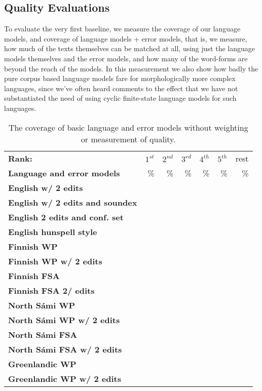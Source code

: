 \documentclass[a4paper,12pt]{article}
\begin{document}

\subsection{Quality Evaluations}

To evaluate the very first baseline, we measure the coverage of our language
models, and coverage of language models + error models, that is, we measure,
how much of the texts themselves can be matched at all, using just the
language models themselves and the error models, and how many of the word-forms
are beyond the reach of the models. In this measurement we also show how badly
the pure corpus based language models fare for morphologically more complex
languages, since we've often heard comments to the effect that we have not
substantiated the need of using cyclic finite-state language models for such
languages.

\begin{table}
    \centering
    \begin{tabular}{|l|r|r|r|r|r|r|}
        \hline
        \bf Rank: & $1^{st}$ & $2^{nd}$ & $3^{rd}$ & $4^{th}$ & $5^{th}$ & rest \\
        \bf Language and error models &  \% & \% & \% & \% & \% & \% \\
        \hline
        \bf English w/ 2 edits & & & & & & \\
     \bf English w/ 2 edits and soundex & & & & & & \\
   \bf English 2 edits and conf. set & & & & & & \\
          \bf English hunspell style & & & & & & \\
        \hline
                   \bf Finnish WP & & & & & & \\
        \bf Finnish WP w/ 2 edits & & & & & & \\
                  \bf Finnish FSA & & & & & & \\
         \bf Finnish FSA 2/ edits & & & & & & \\
        \hline
        \bf North Sámi WP & & & & & & \\
        \bf North Sámi WP w/ 2 edits & & & & & & \\
               \bf North Sámi FSA & & & & & & \\
    \bf North Sámi FSA w/ 2 edits & & & & & & \\
        \hline
        \bf Greenlandic WP & & & & & & \\
        \bf Greenlandic WP w/ 2 edits & & & & & & \\
        \hline
    \end{tabular}
    \caption{The coverage of basic language and error models without weighting
        or measurement of quality.\label{table:baseline-coverage}}
\end{table}
\end{document}
